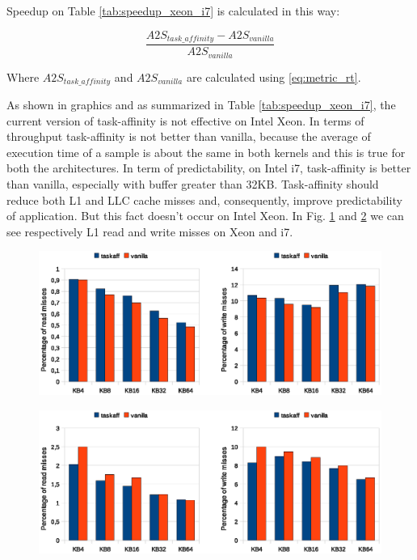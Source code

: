 Speedup on Table \ref{tab:speedup_xeon_i7} is calculated in this way:

\begin{equation}
        \frac{A2S_{task\_affinity} - A2S_{vanilla}}{A2S_{vanilla}}
\label{eq:miss_rate}
\end{equation}

Where $A2S_{task\_affinity}$ and $A2S_{vanilla}$ are calculated using \ref{eq:metric_rt}.

As shown in graphics and as summarized in Table \ref{tab:speedup_xeon_i7}, the current version of task-affinity is not effective on Intel Xeon.
In terms of throughput task-affinity is not better than vanilla, because the average of execution time of a sample is about the same in both kernels 
and this is true for both the architectures. In term of predictability, on Intel i7, task-affinity is better than vanilla, especially with buffer 
greater than 32KB. Task-affinity should reduce both L1 and LLC cache misses and, consequently, improve predictability of application. But this fact 
doesn't occur on Intel Xeon. In Fig. \ref{fig:l1_load_store_Xeon} and \ref{fig:l1_load_store_i7} we can see respectively L1 read and write misses on 
Xeon and i7.

\begin{figure}[htbp]
 \centering
  \includegraphics[width=\widefigure]{images/cache_miss/l1_load_store_Xeon.eps}
  \label{fig:l1_load_store_Xeon}
 \caption{}
\end{figure}

\begin{figure}[htbp]
 \centering
  \includegraphics[width=\widefigure]{images/cache_miss/l1_load_store_i7.eps}
  \label{fig:l1_load_store_i7}
 \caption{}
\end{figure}


